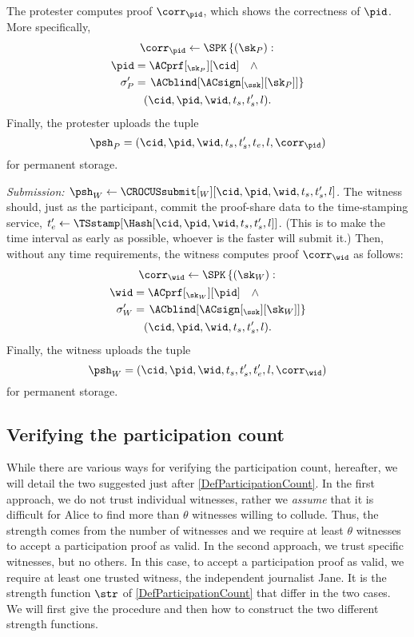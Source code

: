 The protester computes  proof \(\corr_{\pid}\), which shows the 
correctness of \(\pid\).
More specifically,
\begin{multline*}
  \corr_{\pid}\gets \SPK\left\{ (\sk_P) : \right. \\
    \begin{aligned}
      \pid &= \ACprf[_{\sk_P}][\cid] \quad \land \\
      \sigma_P' &= \left. \ACblind[\ACsign[_{\ssk}][\sk_P]] \right\}
    \end{aligned} \\
      (\cid, \pid, \wid, t_s, t_s', l).
\end{multline*}
Finally, the protester uploads the tuple \[
  \psh_P = (\cid, \pid, \wid, t_s, t_s', t_e, l, \corr_{\pid})
\] for permanent storage.

\emph{Submission: \(\psh_W\gets \CROCUSsubmit[_W][\cid, \pid, \wid, t_s, t_s', 
    l]\).}
The witness should, just as the participant, commit the proof-share data to the 
time-stamping service, \(t_e'\gets \TSstamp[\Hash[\cid, \pid, \wid, t_s, t_s', 
  l]]\).
(This is to make the time interval as early as possible, whoever is the faster 
will submit it.)
Then, without any time requirements, the witness computes  proof 
\(\corr_{\wid}\) as follows:
\begin{multline*}
  \corr_{\wid}\gets \SPK\left\{ (\sk_W) : \right. \\
    \begin{aligned}
      \wid &= \ACprf[_{\sk_W}][\pid] \quad \land \\
      \sigma_W' &= \left. \ACblind[\ACsign[_{\ssk}][\sk_W]] \right\}
    \end{aligned} \\
      (\cid, \pid, \wid, t_s, t_s', l).
\end{multline*}
Finally, the witness uploads the tuple \[
  \psh_W = (\cid, \pid, \wid, t_s, t_s', t_e', l, \corr_{\wid})
\] for permanent storage.

\subsection{Verifying the participation count}%
\label{ProtocolVerification}

While there are various ways for verifying the participation count, hereafter, 
we will detail the two suggested just after \cref{DefParticipationCount}.
In the first approach, we do not trust individual witnesses, rather we \emph{assume} that it is difficult for Alice to find more than \(\theta\) witnesses willing to collude.
Thus, the strength comes from the number of witnesses and we require at least \(\theta\) witnesses to accept a participation proof as valid.
In the second approach, we trust specific witnesses, but no others.
In this case, to accept a participation proof as valid, we require at least one trusted witness, the independent journalist Jane.
It is the strength function \(\str\) of \cref{DefParticipationCount} that 
differ in the two cases.
We will first give the procedure and then how to construct the two different 
strength functions.

